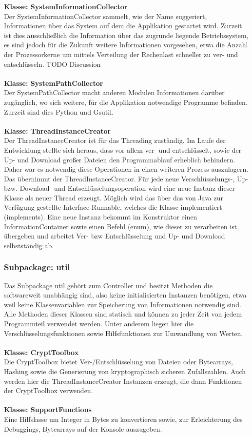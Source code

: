 \documentclass[13pt,a4paper,bibliography=totocnumbered,listof=totocnumbered]{scrartcl}
\begin{document}
\textbf{Klasse: SystemInformationCollector}\\
Der SystemInformationCollector sammelt, wie der Name suggeriert, Informationen über das System auf dem die Applikation gestartet wird. Zurzeit ist dies ausschließlich die Information über das zugrunde liegende Betriebssystem, es sind jedoch für die Zukunft weitere Informationen vorgesehen, etwa die Anzahl der Prozessorkerne um mittels Verteilung der Rechenlast schneller zu ver- und entschlüsseln. TODO Discussion\\\\
\textbf{Klasse: SystemPathCollector}\\
Der SystemPathCollector macht anderen Modulen Informationen darüber zugänglich, wo sich weitere, für die Applikation notwendige Programme befinden. Zurzeit sind dies Python und Gsutil.\\\\
\textbf{Klasse: ThreadInstanceCreator}\\
Der ThreadInstanceCreator ist für das Threading zuständig. Im Laufe der Entwicklung stellte sich heraus, dass vor allem ver- und entschlüsselt, sowie der Up- und Download großer Dateien den Programmablauf erheblich behindern. Daher war es notwendig diese Operationen in einen weiteren Prozess auszulagern. Das übernimmt der ThreadInstanceCreator. Für jede neue Verschlüsselungs-, Up- bzw. Download- und Entschlüsselungsoperation wird eine neue Instanz dieser Klasse als neuer Thread erzeugt. Möglich wird das über das von Java zur Verfügung gestellte Interface Runnable, welches die Klasse implementiert (implements). Eine neue Instanz bekommt im Konstruktor einen InformationContainer sowie einen Befehl (enum), wie dieser zu verarbeiten ist, übergeben und arbeitet Ver- bzw Entschlüsselung und Up- und Download selbstständig ab.
\subsubsection{Subpackage: util}
Das Subpackage util gehört zum Controller und besitzt Methoden die softwareweit unabhängig sind, also keine initialisierten Instanzen benötigen, etwa weil keine Klassenvariablen zur Speicherung von Informationen notwendig sind. Alle Methoden dieser Klassen sind statisch und können zu jeder Zeit von jedem Programmteil verwendet werden. Unter anderem liegen hier die Verschlüsselungsfunktionen sowie Hilfsfunktionen zur Umwandlung von Werten.\\\\
\textbf{Klasse: CryptToolbox}\\
Die CryptToolbox bietet Ver-/Entschlüsselung von Dateien oder Bytearrays, Hashing sowie die Generierung von kryptographisch sicheren Zufallszahlen. Auch werden hier die ThreadInstanceCreator Instanzen erzeugt, die dann Funktionen der CryptToolbox verwenden.\\\\
\textbf{Klasse: SupportFunctions}\\
Eine Hilfslasse um Integer in Bytes zu konvertieren sowie, zur Erleichterung des Debuggings, Bytearrays auf der Konsole auszugeben.
\end{document}
